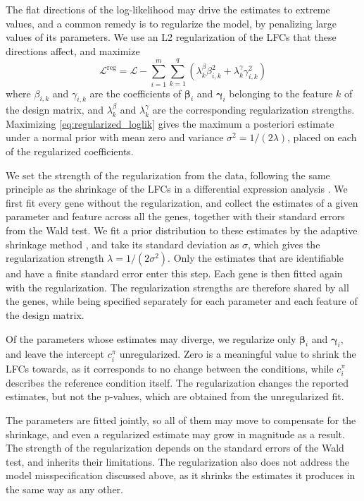 \documentclass[11pt]{article}
\begin{document}
	The flat directions of the log-likelihood may drive the estimates to extreme values, and a common remedy is to regularize the model, by penalizing large values of its parameters. We use an L2 regularization of the LFCs that these directions affect, and maximize
	\begin{equation} \label{eq:regularized_loglik}
		\mathcal{L}^{\mathrm{reg}} = \mathcal{L} - \sum_{i=1}^{m} \sum_{k=1}^{q} \left( \lambda^{\beta}_{k} \beta_{i,k}^{2} + \lambda^{\gamma}_{k} \gamma_{i,k}^{2} \right)
	\end{equation}
	where $\beta_{i,k}$ and $\gamma_{i,k}$ are the coefficients of $\boldsymbol{\beta}_i$ and $\boldsymbol{\gamma}_i$ belonging to the feature $k$ of the design matrix, and $\lambda^{\beta}_{k}$ and $\lambda^{\gamma}_{k}$ are the corresponding regularization strengths. Maximizing \eqref{eq:regularized_loglik} gives the maximum a posteriori estimate under a normal prior with mean zero and variance $\sigma^2 = 1 / (2 \lambda)$, placed on each of the regularized coefficients.

	We set the strength of the regularization from the data, following the same principle as the shrinkage of the LFCs in a differential expression analysis \citep{loveModeratedEstimationFold2014}. We first fit every gene without the regularization, and collect the estimates of a given parameter and feature across all the genes, together with their standard errors from the Wald test. We fit a prior distribution to these estimates by the adaptive shrinkage method \citep{stephensFalseDiscoveryRates2016}, and take its standard deviation as $\sigma$, which gives the regularization strength $\lambda = 1 / (2 \sigma^2)$. Only the estimates that are identifiable and have a finite standard error enter this step. Each gene is then fitted again with the regularization. The regularization strengths are therefore shared by all the genes, while being specified separately for each parameter and each feature of the design matrix.

	Of the parameters whose estimates may diverge, we regularize only $\boldsymbol{\beta}_i$ and $\boldsymbol{\gamma}_i$, and leave the intercept $c^{\pi}_{i}$ unregularized. Zero is a meaningful value to shrink the LFCs towards, as it corresponds to no change between the conditions, while $c^{\pi}_{i}$ describes the reference condition itself. The regularization changes the reported estimates, but not the p-values, which are obtained from the unregularized fit.

	The parameters are fitted jointly, so all of them may move to compensate for the shrinkage, and even a regularized estimate may grow in magnitude as a result. The strength of the regularization depends on the standard errors of the Wald test, and inherits their limitations. The regularization also does not address the model misspecification discussed above, as it shrinks the estimates it produces in the same way as any other.
\end{document}
